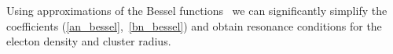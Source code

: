 Using approximations of the Bessel functions~\cite{boren_huffman} we can significantly simplify the coefficients (\ref{an_bessel},~\ref{bn_bessel}) and obtain resonance conditions for the electon density and cluster radius. 


